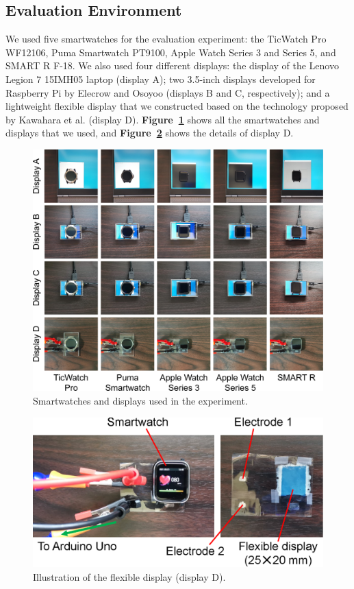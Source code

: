 \documentclass{ieeeaccess}
\newcommand\figref[1]{\textbf{Figure~\ref{fig:#1}}}
\begin{document}
\subsection{Evaluation Environment}
We used five smartwatches for the evaluation experiment: the TicWatch Pro WF12106, Puma Smartwatch PT9100, Apple Watch Series 3 and Series 5, and SMART R F-18. We also used four different displays: the display of the Lenovo Legion 7 15IMH05 laptop (display A); two 3.5-inch displays developed for Raspberry Pi by Elecrow and Osoyoo (displays B and C, respectively); and a lightweight flexible display that we constructed based on the technology proposed by Kawahara et al. \cite{flexible_display} (display D). \figref{smartwatches} shows all the smartwatches and displays that we used, and \figref{flexible} shows the details of display D.

\begin{figure}[!t]
  \centering
  \includegraphics[width=1\linewidth]{figures/smartwatches.eps}
  \caption{Smartwatches and displays used in the experiment.}
  \label{fig:smartwatches}
\end{figure}

\begin{figure}[!t]
  \centering
  \includegraphics[width=1\linewidth]{figures/flexible.eps}
  \caption{Illustration of the flexible display (display D).}
  \label{fig:flexible}
\end{figure}
\end{document}

